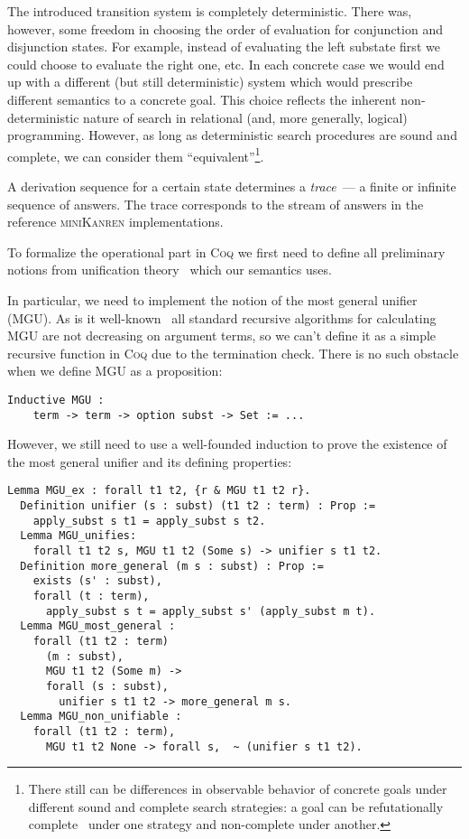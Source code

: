 The introduced transition system is completely deterministic. There was, however, some freedom in choosing the order of evaluation for conjunction and
disjunction states. For example, instead of evaluating the left substate first we could choose to evaluate the right one, etc. In each concrete case we would
end up with a different (but still deterministic) system which would prescribe different semantics to a concrete goal. This choice reflects the inherent
non-deterministic nature of search in relational (and, more generally, logical) programming. However, as long as deterministic search procedures
are sound and complete, we can consider them ``equivalent''\footnote{There still can be differences in observable behavior of concrete goals under different
sound and complete search strategies: a goal can be refutationally complete~\cite{WillThesis} under one strategy and non-complete under another.}.

A derivation sequence for a certain state determines a \emph{trace}~--- a finite or infinite sequence of answers. The trace corresponds to the stream of answers
in the reference \textsc{miniKanren} implementations.

To formalize the operational part in \textsc{Coq} we first need to define all preliminary notions from unification theory~\cite{Unification} which our semantics uses.

In particular, we need to implement the notion of the most general unifier (MGU). As is it well-known~\cite{UnificationMcBride} all standard recursive algorithms for calculating
MGU are not decreasing on argument terms, so we can't define it as a simple recursive function in \textsc{Coq} due to the termination check. There is no such obstacle when we define
MGU as a proposition:

\begin{lstlisting}[language=Coq,basicstyle=\footnotesize]
  Inductive MGU :
    term -> term -> option subst -> Set := ...
\end{lstlisting}

However, we still need to use a well-founded induction to prove the existence of the most general unifier and its defining properties:

\begin{lstlisting}[language=Coq,basicstyle=\footnotesize]
  Lemma MGU_ex : forall t1 t2, {r & MGU t1 t2 r}.
  Definition unifier (s : subst) (t1 t2 : term) : Prop :=
    apply_subst s t1 = apply_subst s t2.
  Lemma MGU_unifies:
    forall t1 t2 s, MGU t1 t2 (Some s) -> unifier s t1 t2.
  Definition more_general (m s : subst) : Prop :=
    exists (s' : subst),
    forall (t : term),
      apply_subst s t = apply_subst s' (apply_subst m t).
  Lemma MGU_most_general :
    forall (t1 t2 : term)
      (m : subst),
      MGU t1 t2 (Some m) ->
      forall (s : subst),
        unifier s t1 t2 -> more_general m s.
  Lemma MGU_non_unifiable :
    forall (t1 t2 : term),
      MGU t1 t2 None -> forall s,  ~ (unifier s t1 t2).
\end{lstlisting}

